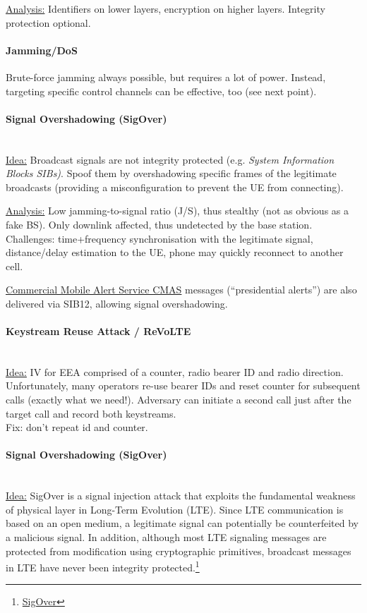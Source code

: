 \underline{Analysis:}
Identifiers on lower layers, encryption on higher layers.
Integrity protection optional.

\paragraph{Jamming/DoS}
Brute-force jamming always possible, but requires a lot of power. Instead,
targeting specific control channels can be effective, too (see next point).

\paragraph{Signal Overshadowing (SigOver)} \mbox{} \\
\underline{Idea:}
Broadcast signals are not integrity protected (e.g. \textit{System Information Blocks SIBs)}.
Spoof them by overshadowing specific frames of the legitimate broadcasts (providing a misconfiguration to prevent the UE from connecting).

\underline{Analysis:}
Low jamming-to-signal ratio (J/S), thus stealthy (not as obvious as a fake BS).
Only downlink affected, thus undetected by the base station.
Challenges: time+frequency synchronisation with the legitimate signal, distance/delay estimation to the UE, phone may quickly reconnect to another cell.

\underline{Commercial Mobile Alert Service CMAS} messages (``presidential alerts'') are also delivered via SIB12, allowing signal overshadowing.

\paragraph{Keystream Reuse Attack / ReVoLTE} \mbox{} \\
\underline{Idea:} IV for EEA comprised of a counter, radio bearer ID and radio direction.
\\
Unfortunately, many operators re-use bearer IDs and reset counter for subsequent calls (exactly what we need!).
Adversary can initiate a second call just after the target call and record both keystreams.
\\
Fix: don't repeat id and counter.

\paragraph{Signal Overshadowing (SigOver)} \mbox{} \\
\underline{Idea:}
SigOver is a signal injection attack that exploits the fundamental weakness of physical layer in Long-Term Evolution (LTE). Since LTE communication is based on an open medium, a legitimate signal can potentially be counterfeited by a malicious signal. In addition, although most LTE signaling messages are protected from modification using cryptographic primitives, broadcast messages in LTE have never been integrity protected.\footnote{\href{https://github.com/SysSec-KAIST/sigover_injector}{SigOver}}

